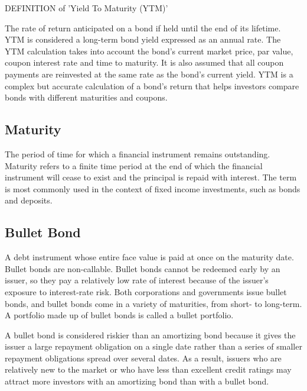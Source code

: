 DEFINITION of 'Yield To Maturity (YTM)'

The rate of return anticipated on a bond if held until the end of its lifetime. YTM is considered a long-term bond yield expressed as an annual rate. The YTM calculation takes into account the bond’s current market price, par value, coupon interest rate and time to maturity. It is also assumed that all coupon payments are reinvested at the same rate as the bond’s current yield. YTM is a complex but accurate calculation of a bond’s return that helps investors compare bonds with different maturities and coupons.


\subsection*{Maturity}
The period of time for which a financial instrument remains outstanding. 
Maturity refers to a finite time period at the end of which the financial instrument will cease to exist and the principal is repaid with interest. The term is most commonly used in the context of fixed income investments, such as bonds and deposits.

\subsection*{Bullet Bond}
A debt instrument whose entire face value is paid at once on the maturity date. 
Bullet bonds are non-callable. Bullet bonds cannot be redeemed early by an issuer, so they pay a relatively low rate of interest 
because of the issuer's exposure to interest-rate risk. 
Both corporations and governments issue bullet bonds, and bullet bonds come in a variety of maturities, from short- to long-term.
A portfolio made up of bullet bonds is called a bullet portfolio.


A bullet bond is considered riskier than an amortizing bond because it gives the issuer a large repayment obligation 
on a single date rather than a series of smaller repayment obligations spread over several dates. 
As a result, issuers who are relatively new to the market or who have less than excellent credit ratings 
may attract more investors with an amortizing bond than with a bullet bond.


